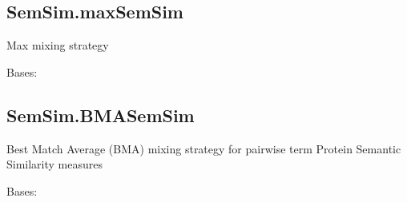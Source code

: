 \documentclass[letterpaper,10pt,english]{sphinxmanual}
\begin{document}
\subsection{SemSim.maxSemSim}
\label{fastsemsim.SemSim:semsim-maxsemsim}\label{fastsemsim.SemSim:module-fastsemsim.SemSim.maxSemSim}
Max mixing strategy

\begin{fulllineitems}
\label{fastsemsim.SemSim:fastsemsim.SemSim.maxSemSim.maxSemSim}
Bases: {\hyperref[fastsemsim.SemSim:fastsemsim.SemSim.MixSemSim.MixSemSim]{}}

\end{fulllineitems}



\subsection{SemSim.BMASemSim}
\label{fastsemsim.SemSim:module-fastsemsim.SemSim.BMASemSim}\label{fastsemsim.SemSim:semsim-bmasemsim}
Best Match Average (BMA) mixing strategy for pairwise term Protein Semantic Similarity measures

\begin{fulllineitems}
\label{fastsemsim.SemSim:fastsemsim.SemSim.BMASemSim.BMASemSim}
Bases: {\hyperref[fastsemsim.SemSim:fastsemsim.SemSim.MixSemSim.MixSemSim]{}}

\begin{fulllineitems}
\label{fastsemsim.SemSim:fastsemsim.SemSim.BMASemSim.BMASemSim.fair}
\end{fulllineitems}


\end{fulllineitems}
\end{document}
